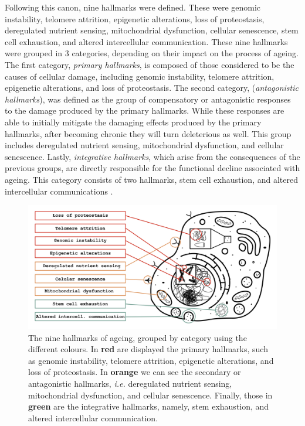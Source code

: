 Following this canon, nine hallmarks were defined.
These were genomic instability, telomere attrition, epigenetic alterations, loss of proteostasis, deregulated nutrient sensing, mitochondrial dysfunction, cellular senescence, stem cell exhaustion, and altered intercellular communication.
These nine hallmarks were grouped in 3 categories, depending on their impact on the process of ageing.
The first category, \emph{primary hallmarks}, is composed of those considered to be the causes of cellular damage, including genomic instability, telomere attrition, epigenetic alterations, and loss of proteostasis.
The second category, (\emph{antagonistic hallmarks}), was defined as the group of compensatory or antagonistic responses to the damage produced by the primary hallmarks.
While these responses are able to initially mitigate the damaging effects produced by the primary hallmarks, after becoming chronic they will turn deleterious as well.
This group includes deregulated nutrient sensing, mitochondrial dysfunction, and cellular senescence.
Lastly, \emph{integrative hallmarks}, which arise from the consequences of the previous groups, are directly responsible for the functional decline associated with ageing.
This category consists of two hallmarks, stem cell exhaustion, and altered intercellular communications \cite{Lopez-Otin2013}.

\begin{figure}[t!]
    \begin{center}
        \includegraphics[width=\textwidth]{figures/hallmarks.pdf}
        \caption[The hallmarks of ageing]{\footnotesize The nine hallmarks of ageing, grouped by category using the different colours.
        In \textcolor{myred1}{\textbf{red}} are displayed the primary hallmarks, such as genomic instability, telomere attrition, epigenetic alterations, and loss of proteostasis.
        In \textcolor{myora1}{\textbf{orange}} we can see the secondary or antagonistic hallmarks, \textit{i.e.} deregulated nutrient sensing, mitochondrial dysfunction, and cellular senescence.
        Finally, those in \textcolor{myaqu1}{\textbf{green}} are the integrative hallmarks, namely, stem exhaustion, and altered intercellular communication.}
        \label{f_hallmarks}
    \end{center}
\end{figure}

